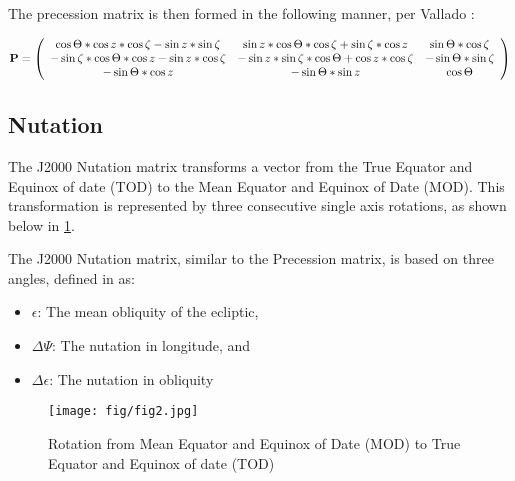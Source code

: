 The precession matrix is then formed in the following manner, per
Vallado \cite{ValladoThird}:

\begin{equation}\label{precession_matrix}
{\bf P} =
\left( \begin{array} {ccc}

\cos \Theta *  \cos z *  \cos \zeta - \sin z * \sin  \zeta
& \sin z * \cos \Theta * \cos \zeta + \sin \zeta * \cos z
& \sin \Theta * \cos \zeta \\

-\sin \zeta * \cos \Theta * \cos z - \sin z * \cos \zeta
& -\sin z * \sin \zeta * \cos \Theta + \cos z * \cos \zeta
& -\sin \Theta * \sin \zeta \\

-\sin \Theta * \cos z
& -\sin \Theta * \sin z
& \cos \Theta

\end{array} \right)
\end{equation}



\subsection{Nutation}

The J2000 Nutation matrix transforms a vector from the True Equator and Equinox
of date (TOD) to the Mean Equator
and Equinox of Date (MOD). This transformation is represented by
three consecutive single axis rotations, as shown below in
\ref{fig:nut}.


The J2000 Nutation matrix, similar to the Precession matrix, is based on three
angles, defined in \cite{Bond1} as:

\begin{itemize}
\item $\epsilon$: The mean obliquity of the ecliptic,
\item $\Delta\Psi$: The nutation in longitude, and
\item $\Delta\epsilon$: The nutation in obliquity
\end{itemize}

\begin{figure}[H]
\begin{center}
\texttt{[image: fig/fig2.jpg]}
\caption{Rotation from Mean Equator and Equinox of Date (MOD) to
True Equator and Equinox of date (TOD) \cite{Bond1}}
\label{fig:nut}
\end{center}
\end{figure}

